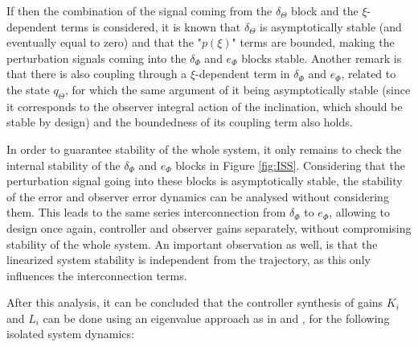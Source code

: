 \documentclass[main.tex]{subfiles}
\begin{document}
If then the combination of the signal coming from the $\delta_\Theta$ block and the $\xi$-dependent terms is considered, it is known that $\delta_\Theta$ is asymptotically stable (and eventually equal to zero) and that the "$p(\xi)$" terms are bounded, making the perturbation signals coming into the $\delta_\Phi$ and $e_\Phi$ blocks stable. Another remark is that there is also coupling through a $\xi$-dependent term in $\delta_\Phi$ and $e_\Phi$, related to the state $q_\Theta$, for which the same argument of it being asymptotically stable (since it corresponds to the observer integral action of the inclination, which should be stable by design) and the boundedness of its coupling term also holds.

In order to guarantee stability of the whole system, it only remains to check the internal stability of the $\delta_\Phi$ and $e_\Phi$ blocks in Figure \ref{fig:ISS}. Considering that the perturbation signal going into these blocks is asymptotically stable, the stability of the error and observer error dynamics can be analysed without considering them. This leads to the same series interconnection from $\delta_\Phi$ to $e_\Phi$, allowing to design once again, controller and observer gains separately, without compromising stability of the whole system. An important observation as well, is that the linearized system stability is independent from the trajectory, as this only influences the interconnection terms.

After this analysis, it can be concluded that the controller synthesis of gains $K_i$ and $L_i$ can be done using an eigenvalue approach as in \cite{Kremers2013} and \cite{Monsieurs2015}, for the following isolated system dynamics:
\end{document}
